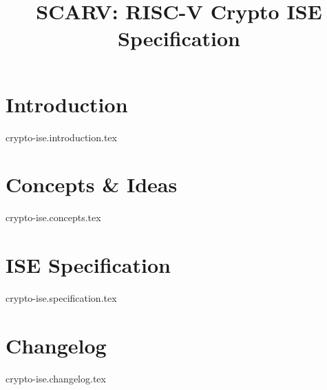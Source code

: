 \documentclass{article}
\title{SCARV: RISC-V Crypto ISE \\ Specification}
\begin{document}
\maketitle

\tableofcontents

\section{Introduction}
{crypto-ise.introduction.tex}

\section{Concepts \& Ideas}
{crypto-ise.concepts.tex}

\section{ISE Specification}
{crypto-ise.specification.tex}


\printbibliography

\newpage
\section{Changelog}
{crypto-ise.changelog.tex}
\end{document}
